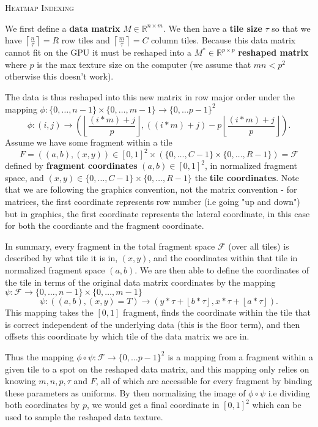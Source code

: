 \documentclass[a4paper]{article}
\newcommand{\Rr}{\mathbb{R}}
\begin{document}
	
	\begin{center}
		\Large{\textsc{Heatmap Indexing}}
	\end{center}

	We first define a \textbf{data matrix} $M \in \Rr^{n\times m}$.  We then have a \textbf{tile size} $\tau$ so that we have  $\left\lceil \frac{n}{\tau} \right\rceil = R$ row tiles and $\left\lceil \frac{m}{\tau} \right\rceil = C $ column tiles.  Because this data matrix cannot fit on the GPU it must be reshaped into a $M^{*} \in \Rr^{p \times p}$ \textbf{reshaped matrix} where $p$ is the max texture size on the computer (we assume that  $mn < p^{2}$ otherwise this doesn't work).  

	The data is thus reshaped into this new matrix in row major order under the mapping $\phi: \{0, \ldots, n - 1\} \times \{0, \ldots, m-1\}  \to \{0, \ldots p-1\}^{2}$ \[
	\phi:	(i, j) \to \left( \left\lfloor  \frac{\left( i * m \right) + j}{p}\right\rfloor, (\left( i * m \right) + j) - p \left\lfloor \frac{\left( i * m \right) + j}{p}\right\rfloor   \right) 
	.\] 
	Assume we have some fragment within a tile \[
		F = \left( \left( a, b \right), \left( x, y \right)   \right) \in [0,1]^{2} \times \left( \{0, \ldots, C - 1\} \times \{0, \ldots, R-1\}  \right) = \mathcal{F}
		\] defined by \textbf{fragment coordinates} $\left( a, b \right) \in [0,1]^{2}$, in normalized fragment space, and $\left( x,y \right) \in   \{0, \ldots, C - 1\} \times \{0, \ldots, R-1\}  $ the \textbf{tile coordinates}. Note that we are following the graphics convention, not the matrix convention - for matrices, the first coordinate represents row number (i.e going "up and down") but in graphics, the first coordinate represents the lateral coordinate, in this case for both the coordiante and the fragment coordinate.  

		In summary, every fragment in the total fragment space $\mathcal{F}$ (over all tiles) is described by what tile it is in, $\left( x, y \right) $, and the coordinates within that tile in normalized fragment space $(a,b)$. We are then able to define the coordinates of the tile in terms of the original data matrix coordinates by the mapping $\psi: \mathcal{F} \to \{0, \ldots, n - 1\} \times \{0, \ldots, m-1\}  $ \[
		\psi: (\left( a, b \right), \left( x, y \right) = T) \to \left( y * \tau + \left\lfloor b * \tau \right\rfloor, x * \tau + \left\lfloor a * \tau \right\rfloor \right)   
	.\]  
	This mapping takes the $[0,1]$ fragment, finds the coordinate within the tile that is correct independent of the underlying data (this is the floor term), and then offsets this coordinate by which tile of the data matrix we are in.

	Thus the mapping $\phi \circ \psi: \mathcal{F} \to \{0, \ldots p-1\}^{2} $ is a mapping from a fragment within a given tile to a spot on the reshaped data matrix, and this mapping only relies on knowing $m, n, p, \tau$ and  $F$, all of which are accessible for every fragment by binding these parameters as uniforms.  By then normalizing the image of $\phi \circ \psi$ i.e dividing both coordinates by  $p$, we would get a final coordinate  in $[0, 1]^{2}$ which can be used to sample the reshaped data texture.
\end{document}
